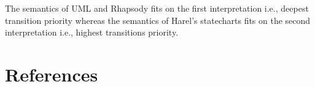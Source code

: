 \documentclass[preprint,5p]{elsarticle}
\begin{document}
The semantics of UML and Rhapsody fits on the first interpretation i.e., deepest transition priority whereas the semantics of Harel's statecharts fits on the second interpretation i.e., highest transitions priority.


\section*{References}

\end{document}
